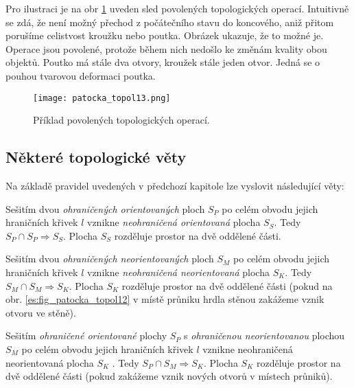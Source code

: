       Pro ilustraci je na obr \ref{es:fig_patocka_topol13} uveden sled povolených topologických 
      operací. Intuitivně se zdá, že není možný přechod z počátečního stavu do koncového, aniž 
      přitom porušíme celistvost kroužku nebo poutka. Obrázek ukazuje, že to možné je. Operace jsou 
      povolené, protože během nich nedošlo ke změnám kvality obou objektů. Poutko má stále dva 
      otvory, kroužek stále jeden otvor. Jedná se o pouhou tvarovou deformaci poutka.
    
      \begin{figure}[ht!]
        \centering  
        \texttt{[image: patocka\_topol13.png]}
        \caption{Příklad povolených topologických operací.\cite[s.~54]{Patocka4}} 
        \label{es:fig_patocka_topol13}
      \end{figure}
    
    \subsection{Některé topologické věty}\label{teo:IchapIIsecIIsubIII}
      Na základě pravidel uvedených v předchozí kapitole lze vyslovit následující věty:
      \begin{lemma}\label{ES:lem_topol03}
        Sešitím dvou \emph{ohraničených orientovaných} ploch \(S_P\) po celém obvodu jejich 
        hraničních křivek \(l\) vznikne \emph{neohraničená orientovaná} plocha \(S_S\). Tedy 
        \(S_P\cap S_P \Rightarrow S_S\). Plocha \(S_S\) rozděluje prostor na dvě oddělené části.
      \end{lemma}  
    
      \begin{lemma}\label{ES:lem_topol04}
        Sešitím dvou \emph{ohraničených neorientovaných} ploch \(S_M\) po celém obvodu jejich 
        hraničních křivek \(l\) vznikne \emph{neohraničená neorientovaná} plocha \(S_K\).
        Tedy \(S_M\cap S_M \Rightarrow S_K\). Plocha \(S_K\) rozděluje prostor na dvě oddělené 
        části (pokud na obr. \ref{es:fig_patocka_topol12} v místě průniku hrdla stěnou zakážeme 
        vznik otvoru ve stěně).
      \end{lemma} 
      
      \begin{lemma}\label{ES:lem_topol05}
        Sešitím \emph{ohraničené orientované} plochy \(S_P\) s \emph{ohraničenou neorientovanou}
        plochou \(S_M\) po celém obvodu jejich hraničních křivek \(l\) vznikne neohraničená 
        neorientovaná plocha \(S_K\) . Tedy \(S_P\cap S_M \Rightarrow S_K\). Plocha \(S_K\) 
        rozděluje prostor na dvě oddělené části (pokud zakážeme vznik nových otvorů v 
        místech průniků).
      \end{lemma} 
      
